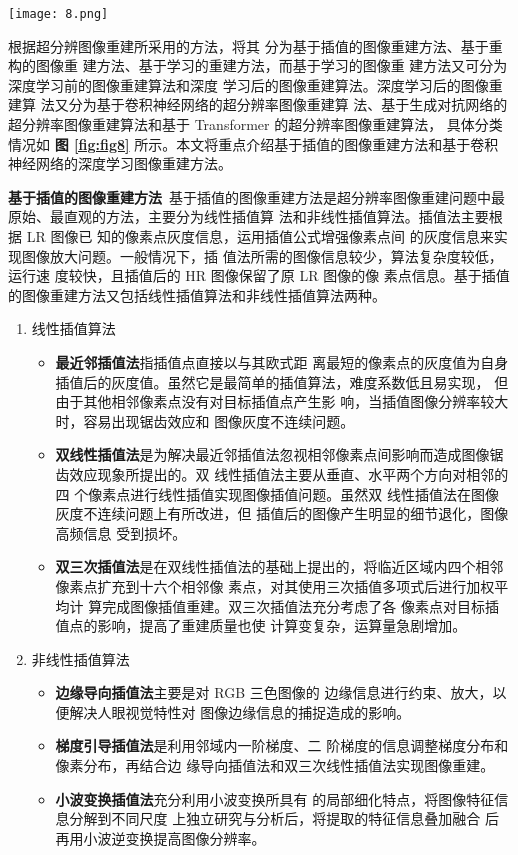 \begin{figure*}[!b]
\centering
\texttt{[image: 8.png]}	
\caption{图像超分辨率重建方法分类}
\label{fig:fig8}
\end{figure*}


根据超分辨图像重建所采用的方法，将其 分为基于插值的图像重建方法、基于重构的图像重 建方法、基于学习的重建方法，而基于学习的图像重 建方法又可分为深度学习前的图像重建算法和深度 学习后的图像重建算法。深度学习后的图像重建算 法又分为基于卷积神经网络的超分辨率图像重建算 法、基于生成对抗网络的超分辨率图像重建算法和基于 Transformer 的超分辨率图像重建算法， 具体分类情况如 \textbf{图 \ref{fig:fig8}} 所示。本文将重点介绍基于插值的图像重建方法和基于卷积神经网络的深度学习图像重建方法。

\noindent\textbf{基于插值的图像重建方法}~基于插值的图像重建方法是超分辨率图像重建问题中最原始、最直观的方法，主要分为线性插值算 法和非线性插值算法。插值法主要根据 LR 图像已 知的像素点灰度信息，运用插值公式增强像素点间 的灰度信息来实现图像放大问题。一般情况下，插 值法所需的图像信息较少，算法复杂度较低，运行速 度较快，且插值后的 HR 图像保留了原 LR 图像的像 素点信息。基于插值的图像重建方法又包括线性插值算法和非线性插值算法两种。

\begin{enumerate}
	\item 线性插值算法
	\begin{itemize}
		\item \textbf{最近邻插值法}指插值点直接以与其欧式距 离最短的像素点的灰度值为自身插值后的灰度值。虽然它是最简单的插值算法，难度系数低且易实现， 但由于其他相邻像素点没有对目标插值点产生影 响，当插值图像分辨率较大时，容易出现锯齿效应和 图像灰度不连续问题。
		\item \textbf{双线性插值法}是为解决最近邻插值法忽视相邻像素点间影响而造成图像锯齿效应现象所提出的。双 线性插值法主要从垂直、水平两个方向对相邻的四 个像素点进行线性插值实现图像插值问题。虽然双 线性插值法在图像灰度不连续问题上有所改进，但 插值后的图像产生明显的细节退化，图像高频信息 受到损坏。
		\item \textbf{双三次插值法}是在双线性插值法的基础上提出的，将临近区域内四个相邻像素点扩充到十六个相邻像 素点，对其使用三次插值多项式后进行加权平均计 算完成图像插值重建。双三次插值法充分考虑了各 像素点对目标插值点的影响，提高了重建质量也使 计算变复杂，运算量急剧增加。
	\end{itemize}
	\item 非线性插值算法
	\begin{itemize}
		\item \textbf{边缘导向插值法}主要是对 RGB 三色图像的 边缘信息进行约束、放大，以便解决人眼视觉特性对 图像边缘信息的捕捉造成的影响。
		\item \textbf{梯度引导插值法}是利用邻域内一阶梯度、二 阶梯度的信息调整梯度分布和像素分布，再结合边 缘导向插值法和双三次线性插值法实现图像重建。
		\item \textbf{小波变换插值法}充分利用小波变换所具有 的局部细化特点，将图像特征信息分解到不同尺度 上独立研究与分析后，将提取的特征信息叠加融合 后再用小波逆变换提高图像分辨率。
	\end{itemize}
\end{enumerate}

